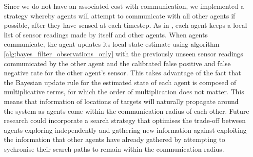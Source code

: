 Since we do not have an associated cost with communication, we implemented a strategy whereby agents will attempt to communicate with all other agents if possible, after they have sensed at each timestep. As in \cite{Waharte2009CoordinatedUAVs}, each agent keeps a local list of sensor readings made by itself and other agents. When agents communicate, the agent updates its local state estimate using algorithm \ref{alg:bayes_filter_observations_only} with the previously unseen sensor readings communicated by the other agent and the calibrated false positive and false negative rate for the other agent's sensor. This takes advantage of the fact that the Bayesian update rule for the estimated state of each agent is composed of multiplicative terms, for which the order of multiplication does not matter. This means that information of locations of targets will naturally propagate around the system as agents come within the communication radius of each other. Future research could incorporate a search strategy that optimises the trade-off between agents exploring independently and gathering new information against exploiting the information that other agents have already gathered by attempting to sychronise their search paths to remain within the communication radius.